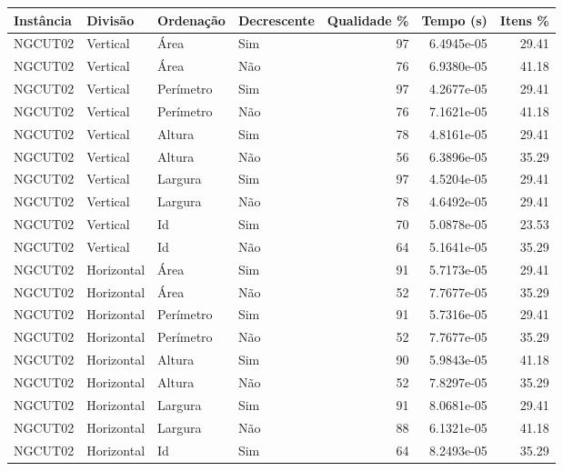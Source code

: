\begin{tabular}{llllrrr}
\hline
Instância & Divisão     & Ordenação & Decrescente & Qualidade \% & Tempo (s)  & Itens \% \\
\hline
NGCUT02   & Vertical    & Área      & Sim         & 97           & 6.4945e-05 & 29.41    \\
NGCUT02   & Vertical    & Área      & Não         & 76           & 6.9380e-05 & 41.18    \\
NGCUT02   & Vertical    & Perímetro & Sim         & 97           & 4.2677e-05 & 29.41    \\
NGCUT02   & Vertical    & Perímetro & Não         & 76           & 7.1621e-05 & 41.18    \\
NGCUT02   & Vertical    & Altura    & Sim         & 78           & 4.8161e-05 & 29.41    \\
NGCUT02   & Vertical    & Altura    & Não         & 56           & 6.3896e-05 & 35.29    \\
NGCUT02   & Vertical    & Largura   & Sim         & 97           & 4.5204e-05 & 29.41    \\
NGCUT02   & Vertical    & Largura   & Não         & 78           & 4.6492e-05 & 29.41    \\
NGCUT02   & Vertical    & Id        & Sim         & 70           & 5.0878e-05 & 23.53    \\
NGCUT02   & Vertical    & Id        & Não         & 64           & 5.1641e-05 & 35.29    \\
NGCUT02   & Horizontal  & Área      & Sim         & 91           & 5.7173e-05 & 29.41    \\
NGCUT02   & Horizontal  & Área      & Não         & 52           & 7.7677e-05 & 35.29    \\
NGCUT02   & Horizontal  & Perímetro & Sim         & 91           & 5.7316e-05 & 29.41    \\
NGCUT02   & Horizontal  & Perímetro & Não         & 52           & 7.7677e-05 & 35.29    \\
NGCUT02   & Horizontal  & Altura    & Sim         & 90           & 5.9843e-05 & 41.18    \\
NGCUT02   & Horizontal  & Altura    & Não         & 52           & 7.8297e-05 & 35.29    \\
NGCUT02   & Horizontal  & Largura   & Sim         & 91           & 8.0681e-05 & 29.41    \\
NGCUT02   & Horizontal  & Largura   & Não         & 88           & 6.1321e-05 & 41.18    \\
NGCUT02   & Horizontal  & Id        & Sim         & 64           & 8.2493e-05 & 35.29    \\

\end{tabular}
